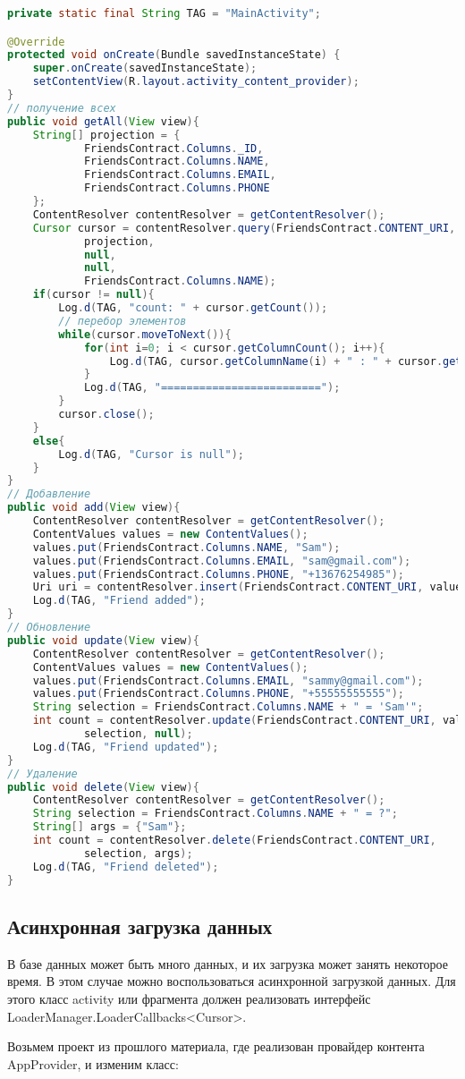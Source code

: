 \begin{lstlisting}[language=Java
	, label=lst:
	]
private static final String TAG = "MainActivity";

@Override
protected void onCreate(Bundle savedInstanceState) {
	super.onCreate(savedInstanceState);
	setContentView(R.layout.activity_content_provider);
}
// получение всех
public void getAll(View view){
	String[] projection = {
			FriendsContract.Columns._ID,
			FriendsContract.Columns.NAME,
			FriendsContract.Columns.EMAIL,
			FriendsContract.Columns.PHONE
	};
	ContentResolver contentResolver = getContentResolver();
	Cursor cursor = contentResolver.query(FriendsContract.CONTENT_URI,
			projection,
			null,
			null,
			FriendsContract.Columns.NAME);
	if(cursor != null){
		Log.d(TAG, "count: " + cursor.getCount());
		// перебор элементов
		while(cursor.moveToNext()){
			for(int i=0; i < cursor.getColumnCount(); i++){
				Log.d(TAG, cursor.getColumnName(i) + " : " + cursor.getString(i));
			}
			Log.d(TAG, "=========================");
		}
		cursor.close();
	}
	else{
		Log.d(TAG, "Cursor is null");
	}
}
// Добавление
public void add(View view){
	ContentResolver contentResolver = getContentResolver();
	ContentValues values = new ContentValues();
	values.put(FriendsContract.Columns.NAME, "Sam");
	values.put(FriendsContract.Columns.EMAIL, "sam@gmail.com");
	values.put(FriendsContract.Columns.PHONE, "+13676254985");
	Uri uri = contentResolver.insert(FriendsContract.CONTENT_URI, values);
	Log.d(TAG, "Friend added");
}
// Обновление
public void update(View view){
	ContentResolver contentResolver = getContentResolver();
	ContentValues values = new ContentValues();
	values.put(FriendsContract.Columns.EMAIL, "sammy@gmail.com");
	values.put(FriendsContract.Columns.PHONE, "+55555555555");
	String selection = FriendsContract.Columns.NAME + " = 'Sam'";
	int count = contentResolver.update(FriendsContract.CONTENT_URI, values,
			selection, null);
	Log.d(TAG, "Friend updated");
}
// Удаление
public void delete(View view){
	ContentResolver contentResolver = getContentResolver();
	String selection = FriendsContract.Columns.NAME + " = ?";
	String[] args = {"Sam"};
	int count = contentResolver.delete(FriendsContract.CONTENT_URI,
			selection, args);
	Log.d(TAG, "Friend deleted");
}
\end{lstlisting}

\subsection{Асинхронная загрузка данных}
В базе данных может быть много данных, и их загрузка может занять
некоторое время. В этом случае можно воспользоваться асинхронной
загрузкой данных. Для этого класс activity или фрагмента должен
реализовать интерфейс LoaderManager.LoaderCallbacks<Cursor>.\par
Возьмем проект из прошлого материала, где реализован провайдер контента
AppProvider, и изменим класс:

